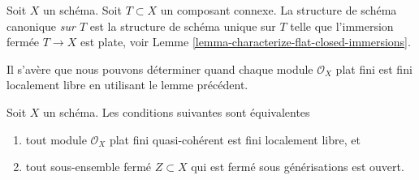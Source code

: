 \begin{definition}
\label{definition-scheme-structure-connected-component}
Soit $X$ un schéma. Soit $T \subset X$ un composant connexe. La structure
de schéma canonique {\it sur $T$}
est la structure de schéma unique sur $T$ telle
que l'immersion
fermée $T \to X$ est plate, voir Lemme \ref{lemma-characterize-flat-closed-immersions}.
\end{definition}

\noindent
Il s'avère que nous pouvons déterminer quand chaque module $\mathcal{O}_X$
plat fini est fini localement libre en utilisant le lemme précédent.

\begin{lemma}
\label{lemma-finite-flat-is-finite-locally-free}
Soit $X$ un schéma. Les conditions suivantes sont équivalentes
\begin{enumerate}
\item tout module $\mathcal{O}_X$ plat fini quasi-cohérent est fini
localement libre, et
\item tout sous-ensemble fermé $Z \subset X$ qui est fermé sous générisations est
ouvert.
\end{enumerate}
\end{lemma}

